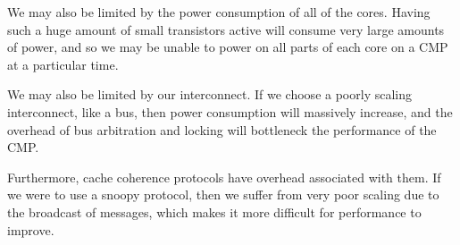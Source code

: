 \begin{enumerate}[label=(\alph*)]
    We may also be limited by the power consumption of all of the cores. Having such a huge amount of small transistors active will consume very large amounts of power, and so we may be unable to power on all parts of each core on a CMP at a particular time.

    We may also be limited by our interconnect. If we choose a poorly scaling interconnect, like a bus, then power consumption will massively increase, and the overhead of bus arbitration and locking will bottleneck the performance of the CMP.

    Furthermore, cache coherence protocols have overhead associated with them. If we were to use a snoopy protocol, then we suffer from very poor scaling due to the broadcast of messages, which makes it more difficult for performance to improve.





        
\end{enumerate}

